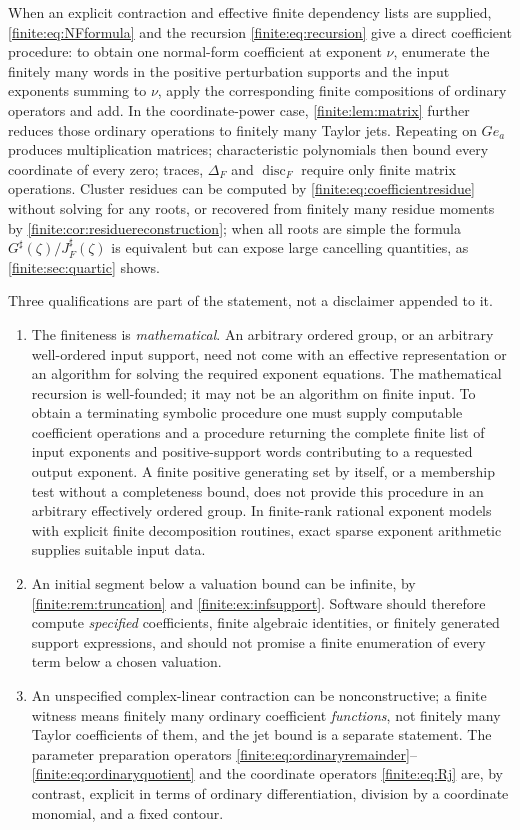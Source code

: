 \documentclass[11pt,letterpaper]{article}
\theoremstyle{definition}
\theoremstyle{remark}
\newcommand{\sh}{^{\sharp}}
\DeclareMathOperator{\disc}{disc}
\numberwithin{equation}{section}
\begin{document}
When an explicit contraction and effective finite dependency lists are supplied, \eqref{finite:eq:NFformula} and the recursion \eqref{finite:eq:recursion} give a direct coefficient procedure: to obtain one normal-form coefficient at exponent $\nu$, enumerate the finitely many words in the positive perturbation supports and the input exponents summing to $\nu$, apply the corresponding finite compositions of ordinary operators and add. In the coordinate-power case, \cref{finite:lem:matrix} further reduces those ordinary operations to finitely many Taylor jets. Repeating on $Ge_a$ produces multiplication matrices; characteristic polynomials then bound every coordinate of every zero; traces, $\Delta_F$ and $\disc_F$ require only finite matrix operations. Cluster residues can be computed by \eqref{finite:eq:coefficientresidue} without solving for any roots, or recovered from finitely many residue moments by \cref{finite:cor:residuereconstruction}; when all roots are simple the formula $G\sh(\zeta)/J_F\sh(\zeta)$ is equivalent but can expose large cancelling quantities, as \cref{finite:sec:quartic} shows.

Three qualifications are part of the statement, not a disclaimer appended to it.

\begin{enumerate}
\item The finiteness is \emph{mathematical}. An arbitrary ordered group, or an arbitrary well-ordered input support, need not come with an effective representation or an algorithm for solving the required exponent equations. The mathematical recursion is well-founded; it may not be an algorithm on finite input. To obtain a terminating symbolic procedure one must supply computable coefficient operations and a procedure returning the complete finite list of input exponents and positive-support words contributing to a requested output exponent. A finite positive generating set by itself, or a membership test without a completeness bound, does not provide this procedure in an arbitrary effectively ordered group. In finite-rank rational exponent models with explicit finite decomposition routines, exact sparse exponent arithmetic supplies suitable input data.
\item An initial segment below a valuation bound can be infinite, by \cref{finite:rem:truncation} and \cref{finite:ex:infsupport}. Software should therefore compute \emph{specified} coefficients, finite algebraic identities, or finitely generated support expressions, and should not promise a finite enumeration of every term below a chosen valuation.
\item An unspecified complex-linear contraction can be nonconstructive; a finite witness means finitely many ordinary coefficient \emph{functions}, not finitely many Taylor coefficients of them, and the jet bound is a separate statement. The parameter preparation operators \eqref{finite:eq:ordinaryremainder}--\eqref{finite:eq:ordinaryquotient} and the coordinate operators \eqref{finite:eq:Rj} are, by contrast, explicit in terms of ordinary differentiation, division by a coordinate monomial, and a fixed contour.
\end{enumerate}
\end{document}
